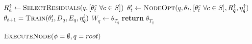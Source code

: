 \begin{algorithm}[H]
\begin{onehalfspace}
\begin{algorithmic}[1]
            \EndFor

             \label{alg:B-HFL:line:13}
            \State $ R^\uparrow_a \gets \Call{SelectResiduals}{q,[\theta^c_t \,\, \forall c \in S]}$ \label{alg:B-HFL:line:14}
            \EndFor
            \State $\theta_t^\prime \gets \Call{NodeOpt}{q,\theta_t, [\theta^c_t \,\, \forall c \in S], R^\uparrow_q, \eta^{\uparrow}_q}  $  \label{alg:B-HFL:line:15}
            \State $\theta_{t+1} = \Call{Train}{\theta_{t}^\prime,D_q,  E_q, \eta^l_q}$  \label{alg:B-HFL:line:7}
            \EndFor
            \State $W_q \gets \theta_{T_q}$  \label{alg:B-HFL:line:16}
            \State \textbf{return} $\theta_{T_q}$ \label{alg:B-HFL:line:17}
            \EndProcedure

            \State $\Call{ExecuteNode}{\phi = \emptyset, q = root}$
        \end{algorithmic}
    \end{onehalfspace}
\end{algorithm}

